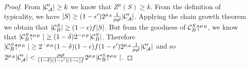 \begin{proof}
    From $|\mathcal{C}'_\mathcal{A}| \geq k$ we know that $Z^\mu(S) \geq k$. From the
    definition of typicality, we have $|S| \geq (1 -
    \epsilon')2^{\mu_A}\frac{1}{pqt}|\mathcal{C}'_\mathcal{A}|$.
    Applying the chain growth theorem \cite{backbone} we obtain that $|\mathcal{C}_B^S|
    \geq (1 - \epsilon)f|S|$. But from the goodness of $\mathcal{C}_B^S\negthickspace\uparrow^{\mu_B}$, we
    know that $|\mathcal{C}_B^S\negthickspace\uparrow^{\mu_B}| \geq (1 -
    \delta)2^{-\mu_B}|\mathcal{C}_B^S|$. Therefore $|\mathcal{C}_B^S\negthickspace\uparrow^{\mu_B}| \geq
    2^{-\mu_B}(1 - \delta)(1 - \epsilon)f(1 -
    \epsilon')2^{\mu_\mathcal{A}}\frac{1}{pqt}|\mathcal{C}'_\mathcal{A}|$ and so
    $2^{\mu_\mathcal{A}}|\mathcal{C}'_\mathcal{A}|
    <
    \frac{pqt}{(1 - \delta)(1 -
    \epsilon')(1 - \epsilon)f}2^{\mu_B}|\mathcal{C}_B^S\negthickspace\uparrow^{\mu_B}|$.
    \Qed
\end{proof}

